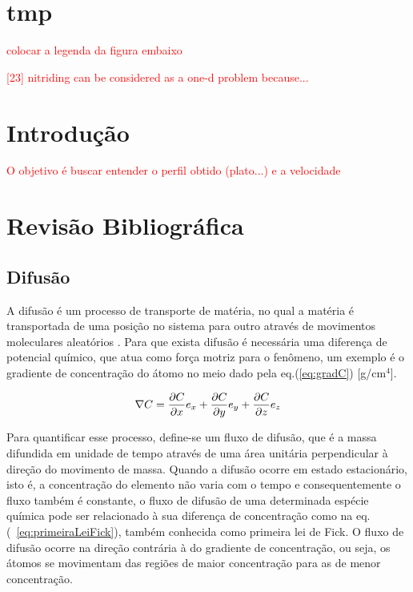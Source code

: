 \documentclass[]{politex}
\newcommand\myworries[1]{\textcolor{red}{#1}}
\begin{document}
\capa

\chapter{tmp}
\par \myworries{colocar a legenda da figura embaixo}

\myworries{[23] nitriding can be considered as a one-d problem because...
}
\listadefiguras
\listadetabelas

\sumario


\chapter{Introdução}

\myworries{O objetivo é buscar entender o perfil obtido (plato...) e a velocidade}

\chapter{Revisão Bibliográfica}
\section{Difusão}
\label{sec:difusao}
	A difusão é um processo de transporte de matéria, no qual a matéria é transportada de uma posição no sistema para outro através de movimentos moleculares aleatórios \cite{crank1979mathematics}. Para que exista difusão é necessária uma diferença de potencial químico, que atua como força motriz para o fenômeno, um exemplo é o gradiente de concentração do átomo no meio dado pela eq.(\ref{eq:gradC}) [g/cm$^4$]. 

\begin{equation} \label{eq:gradC}
\nabla C = \pdv{C}{x}e_x + \pdv{C}{y}e_y + \pdv{C}{z}e_z
\end{equation}

Para quantificar esse processo, define-se um fluxo de difusão, que é a massa difundida em unidade de tempo através de uma área unitária perpendicular à direção do movimento de massa. Quando a difusão ocorre em estado estacionário, isto é, a concentração do elemento não varia com o tempo e consequentemente o fluxo também é constante, o fluxo de difusão de uma determinada espécie química pode ser relacionado à sua diferença de concentração como na eq.(~\ref{eq:primeiraLeiFick}), também conhecida como primeira lei de Fick. O fluxo de difusão ocorre na direção contrária à do gradiente de concentração, ou seja, os átomos se movimentam das regiões de maior concentração para as de menor concentração.
\end{document}
